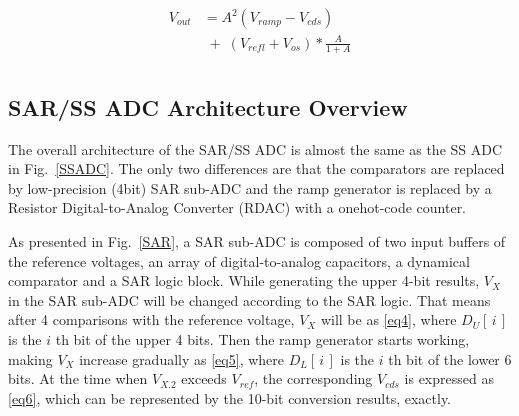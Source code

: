 \begin{equation}
	\begin{aligned}
		V_{out}&=A^2(V_{ramp}-V_{cds})\\
		&\;{+}\;\left(V_{refl}+V_{os}\right)\ast\frac{A}{1+A}\\ 		
		\label{eq3}
	\end{aligned}
\end{equation}

\subsection{SAR/SS ADC Architecture Overview}\label{over2}

The overall architecture of the SAR/SS ADC is almost the same as the SS ADC in Fig.~\ref{SSADC}. The only two differences are that the comparators are replaced by low-precision (4bit) SAR sub-ADC and
the ramp generator is replaced by a Resistor Digital-to-Analog Converter (RDAC) with a onehot-code counter.

As presented in Fig.~\ref{SAR}, a SAR sub-ADC is composed of two input buffers of the reference voltages, an array of digital-to-analog capacitors, a dynamical comparator and a SAR logic block. While generating the upper 4-bit results, $V_{X}$ in the SAR sub-ADC will be changed according to the SAR logic. That means after 4 comparisons 
with the reference voltage, $V_{X}$ will be as \eqref{eq4}, where $D_{U}\left[\,i\,\right]$ is the $i$ th bit of the upper 4 bits. 
Then the ramp generator starts working, making $V_{X}$ increase gradually as \eqref{eq5}, where $D_{L}\left[\,i\,\right]$ is the $i$ th bit of the lower 6 bits. 
At the time when $V_{X.2}$ exceeds $V_{ref}$, the corresponding $V_{cds}$ is expressed as \eqref{eq6}, which can be represented by the 10-bit conversion results, exactly.

